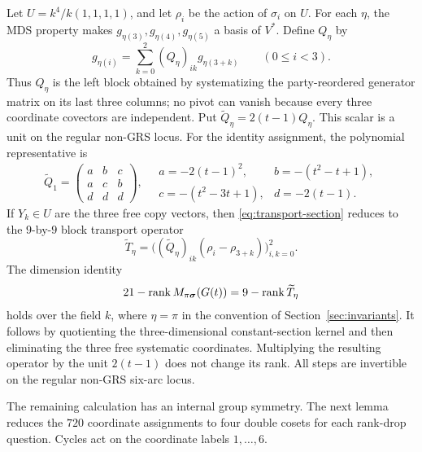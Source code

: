 Let \(U=k^4/k(1,1,1,1)\), and let \(\rho_i\) be the action of
\(\sigma_i\) on \(U\).  For each \(\eta\), the MDS property makes
\(g_{\eta(3)},g_{\eta(4)},g_{\eta(5)}\) a basis of \(V^*\).  Define
\(Q_\eta\) by
\begin{equation}\label{eq:transport-systematic}
 g_{\eta(i)}=\sum_{k=0}^2(Q_\eta)_{ik}g_{\eta(3+k)}
 \qquad(0\leq i<3).
\end{equation}
Thus \(Q_\eta\) is the left block obtained by systematizing the
party-reordered generator matrix on its last three columns; no pivot can
vanish because every three coordinate covectors are independent.  Put
\(\widetilde Q_\eta=2(t-1)Q_\eta\).  This scalar is a unit on the regular
non-GRS locus.  For the identity assignment, the polynomial representative is
\[
\widetilde Q_1=\begin{pmatrix}a&b&c\\a&c&b\\d&d&d\end{pmatrix},
\quad
\begin{array}{ll}
a=-2(t-1)^2,&b=-(t^2-t+1),\\
c=-(t^2-3t+1),&d=-2(t-1).
\end{array}
\]
If \(Y_k\in U\) are the three free copy vectors, then
\eqref{eq:transport-section} reduces
to the \(9\)-by-\(9\) block transport operator
\begin{equation}\label{eq:transport-operator}
 \widetilde T_\eta
 =\bigl((\widetilde Q_\eta)_{ik}(\rho_i-\rho_{3+k})\bigr)_{i,k=0}^2.
\end{equation}
The dimension identity
\begin{equation}\label{eq:transport-rank-bridge}
 21-\operatorname{rank} M_{\pi\boldsymbol\sigma}(G(t))
   =9-\operatorname{rank}\widetilde T_\eta
\end{equation}
holds over the field \(k\), where \(\eta=\pi\) in the convention of
Section~\ref{sec:invariants}.  It follows by quotienting the
three-dimensional constant-section kernel and then eliminating the three
free systematic coordinates.  Multiplying the resulting operator by
the unit \(2(t-1)\) does not change its rank.  All steps are invertible
on the regular non-GRS six-arc locus.

The remaining calculation has an internal group symmetry.  The next lemma
reduces the \(720\) coordinate assignments to four double cosets for each
rank-drop question.  Cycles act on the coordinate labels \(1,\ldots,6\).

